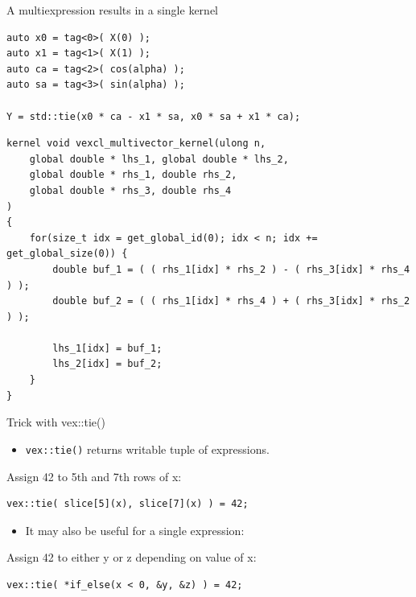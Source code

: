 \documentclass[@BEAMER_OPTIONS@]{beamer}
\newcommand{\code}[1]{\lstinline|#1|}
\begin{document}
\begin{frame}[fragile,shrink=5]{A multiexpression results in a single kernel}
    \begin{exampleblock}{}
        \begin{lstlisting}
auto x0 = tag<0>( X(0) );
auto x1 = tag<1>( X(1) );
auto ca = tag<2>( cos(alpha) );
auto sa = tag<3>( sin(alpha) );

Y = std::tie(x0 * ca - x1 * sa, x0 * sa + x1 * ca);
        \end{lstlisting}
    \end{exampleblock}
    \begin{exampleblock}{}
        \begin{lstlisting}
kernel void vexcl_multivector_kernel(ulong n,
    global double * lhs_1, global double * lhs_2,
    global double * rhs_1, double rhs_2,
    global double * rhs_3, double rhs_4
)
{
    for(size_t idx = get_global_id(0); idx < n; idx += get_global_size(0)) {
        double buf_1 = ( ( rhs_1[idx] * rhs_2 ) - ( rhs_3[idx] * rhs_4 ) );
        double buf_2 = ( ( rhs_1[idx] * rhs_4 ) + ( rhs_3[idx] * rhs_2 ) );

        lhs_1[idx] = buf_1;
        lhs_2[idx] = buf_2;
    }
}

        \end{lstlisting}
    \end{exampleblock}
\end{frame}

\note{ }

\begin{frame}[fragile]{Trick with vex::tie()}
    \begin{itemize}
        \item \code{vex::tie()} returns writable tuple of expressions.
    \end{itemize}
    \begin{exampleblock}{Assign 42 to 5th and 7th rows of x:}
        \begin{lstlisting}
vex::tie( slice[5](x), slice[7](x) ) = 42;
        \end{lstlisting}
    \end{exampleblock}
    \begin{itemize}
        \item It may also be useful for a single expression:
    \end{itemize}
    \begin{exampleblock}{Assign 42 to either y or z depending on value of x:}
        \begin{lstlisting}
vex::tie( *if_else(x < 0, &y, &z) ) = 42;
        \end{lstlisting}
    \end{exampleblock}
\end{frame}
\end{document}
